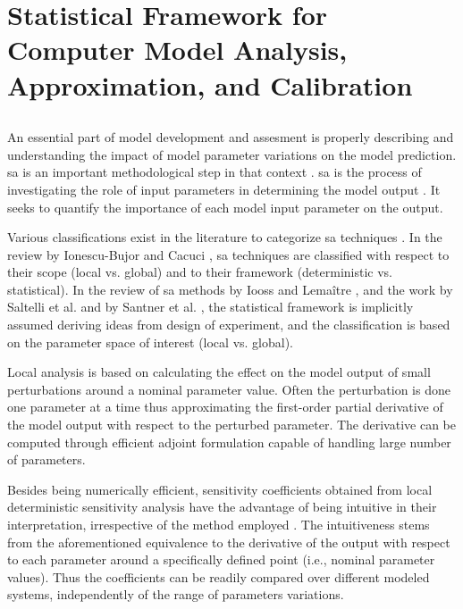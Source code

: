 \section[Statistical Framework]{Statistical Framework for Computer Model Analysis, Approximation, and Calibration}\label{sec:intro_statistical_framework}

\subsection{}

An essential part of model development and assesment is 
properly describing and understanding the impact of model parameter variations on the model prediction.
\Gls{sa} is an important methodological step in that context \cite{Trucano2006}.
\gls{sa} is the process of investigating the role of input parameters in determining the model output \cite{Iooss2015}. 
It seeks to quantify the importance of each model input parameter on the output.

Various classifications exist in the literature to categorize \gls{sa} techniques \cite{Frey2002, Ionescu-Bujor2004, Cacuci2004, Saltelli2008, Iooss2015}.
In the review by Ionescu-Bujor and Cacuci \cite{Ionescu-Bujor2004, Cacuci2004}, 
\gls{sa} techniques are classified with respect to their scope (local vs. global) and to their framework (deterministic vs. statistical).
In the review of \gls{sa} methods by Iooss and Lemaître \cite{Iooss2015}, 
and the work by Saltelli et al. \cite{Saltelli2008} and by Santner et al. \cite{Santner2003}, 
the statistical framework is implicitly assumed deriving ideas from design of experiment, 
and the classification is based on the parameter space of interest (local vs. global).

Local analysis is based on calculating the effect on the model output of small perturbations around a nominal parameter value. 
Often the perturbation is done one parameter at a time thus approximating the first-order partial derivative of the model output with respect to the perturbed parameter. 
The derivative can be computed through efficient adjoint formulation \cite{Cacuci2003,Cacuci2010} capable of handling large number of parameters.

Besides being numerically efficient, 
sensitivity coefficients obtained from local deterministic sensitivity analysis have the advantage of being intuitive in their interpretation, 
irrespective of the method employed \cite{Razavi2015}. 
The intuitiveness stems from the aforementioned equivalence to the derivative of the output with respect to each parameter \cite{Ionescu-Bujor2004} around a specifically defined point (i.e., nominal parameter values). 
Thus the coefficients can be readily compared over different modeled systems, 
independently of the range of parameters variations.

